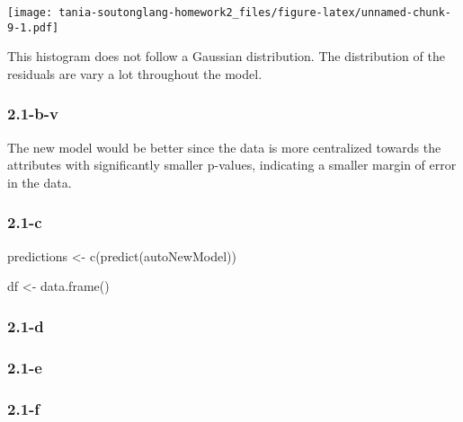 \documentclass[
]{article}
\newenvironment{Shaded}{\begin{snugshade}}{\end{snugshade}}
\newcommand{\FunctionTok}[1]{\textcolor[rgb]{0.00,0.00,0.00}{#1}}
\newcommand{\NormalTok}[1]{#1}
\newcommand{\OtherTok}[1]{\textcolor[rgb]{0.56,0.35,0.01}{#1}}
\begin{document}
\texttt{[image: tania-soutonglang-homework2\_files/figure-latex/unnamed-chunk-9-1.pdf]}

This histogram does not follow a Gaussian distribution. The distribution
of the residuals are vary a lot throughout the model.

\hypertarget{b-v}{%
\subsubsection{2.1-b-v}\label{b-v}}

The new model would be better since the data is more centralized towards
the attributes with significantly smaller p-values, indicating a smaller
margin of error in the data.

\hypertarget{c}{%
\subsubsection{2.1-c}\label{c}}

\begin{Shaded}
\begin{Highlighting}[]
\NormalTok{predictions }\OtherTok{\textless{}{-}} \FunctionTok{c}\NormalTok{(}\FunctionTok{predict}\NormalTok{(autoNewModel))}

\NormalTok{df }\OtherTok{\textless{}{-}} \FunctionTok{data.frame}\NormalTok{()}
\end{Highlighting}
\end{Shaded}

\hypertarget{d}{%
\subsubsection{2.1-d}\label{d}}

\hypertarget{e}{%
\subsubsection{2.1-e}\label{e}}

\hypertarget{f}{%
\subsubsection{2.1-f}\label{f}}
\end{document}
